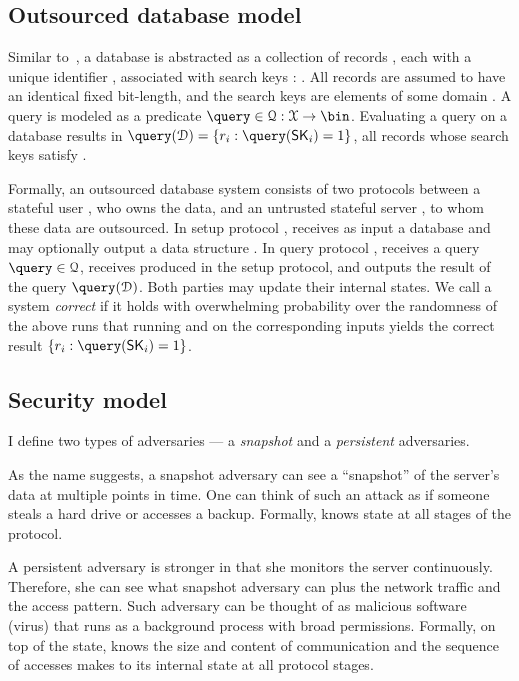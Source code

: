 		\subsection{Outsourced database model}

			Similar to~\cite{epsolute}, a database is abstracted as a collection of \dataSize{} records \record{}, each with a unique identifier \recordID{}, associated with search keys \searchKey{}: \databaseDef{}.
			All records are assumed to have an identical fixed bit-length, and the search keys are elements of some domain \searchKeyDomain{}.
			A query is modeled as a predicate $\query \in \querySet: \searchKeyDomain \to \bin$.
			Evaluating a query \query{} on a database \database{} results in $\query( \database ) = \{ \record_i : \query( \searchKey_i ) = 1 \}$, all records whose search keys satisfy \query{}.

			Formally, an outsourced database system consists of two protocols between a stateful user \user{}, who owns the data, and an untrusted stateful server \server{}, to whom these data are outsourced.
			In setup protocol \protocolSetup{}, \user{} receives as input a database \databaseDef{} and \server{} may optionally output a data structure \serverDS{}.
			In query protocol \protocolQuery{}, \user{} receives a query $\query \in \querySet$, \server{} receives \serverDS{} produced in the setup protocol, and \user{} outputs the result of the query $\query( \database )$.
			Both parties may update their internal states.
			We call a system \emph{correct} if it holds with overwhelming probability over the randomness of the above runs that running \protocolSetup{} and  \protocolQuery{} on the corresponding inputs yields the correct result $\{ \record_i : \query( \searchKey_i ) = 1 \}$.

		\subsection{Security model}

			I define two types of adversaries --- a \emph{snapshot} and a \emph{persistent} adversaries.

			As the name suggests, a snapshot adversary can see a ``snapshot'' of the server's data at multiple points in time.
			One can think of such an attack as if someone steals a hard drive or accesses a backup.
			Formally, \adversary{} knows \server{} state at all stages of the protocol.

			A persistent adversary is stronger in that she monitors the server continuously.
			Therefore, she can see what snapshot adversary can plus the network traffic and the access pattern.
			Such adversary can be thought of as malicious software (virus) that runs as a background process with broad permissions.
			Formally, on top of the \server{} state, \adversary{} knows the size and content of \server{} communication and the sequence of accesses \server{} makes to its internal state at all protocol stages.

